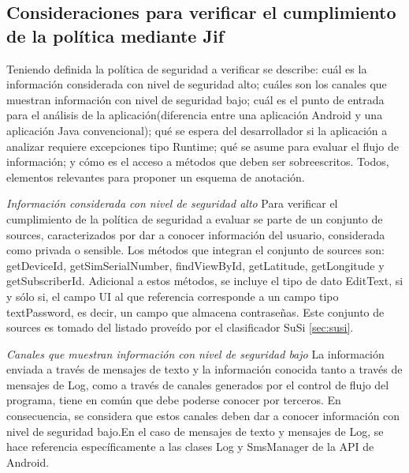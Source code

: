 \subsection{Consideraciones para verificar el cumplimiento de la política
mediante Jif} 
\label{subsec:consVerPol}
Teniendo definida la política de seguridad a verificar se describe: cuál es la
información considerada con nivel de seguridad alto; cuáles son los canales que
muestran información con nivel de seguridad bajo; cuál es el punto de entrada
para el análisis de la aplicación(diferencia entre una aplicación Android y una
aplicación Java convencional); qué se espera del desarrollador si la aplicación
a analizar requiere excepciones tipo Runtime; qué se asume para evaluar el flujo
de información; y cómo es el acceso a métodos que deben ser
sobreescritos.\newline
Todos, elementos relevantes para proponer un esquema de anotación.

\textit{Información considerada con nivel de seguridad alto}\newline
Para verificar el cumplimiento de la política de seguridad a evaluar se parte de
un conjunto de sources, caracterizados por dar a conocer
información del usuario, considerada como privada o sensible. Los métodos que integran
el conjunto de sources son: getDeviceId, getSimSerialNumber, findViewById,
getLatitude, getLongitude y getSubscriberId. Adicional a estos métodos, se
incluye el tipo de dato EditText, si y sólo si, el campo UI al que referencia
corresponde a un campo tipo textPassword, es decir, un campo que almacena
contraseñas.\newline 
Este conjunto de sources es tomado del listado proveído por el clasificador SuSi
\ref{sec:susi}.

\textit{Canales que muestran información con nivel de seguridad bajo}\newline
La información enviada a través de mensajes de texto y la información conocida
tanto a través de mensajes de Log, como a través de canales generados por el
control de flujo del programa, tiene en común que debe poderse conocer por
terceros.
En consecuencia, se considera que estos canales deben dar a conocer información
con nivel de seguridad bajo.\newline En el caso de mensajes de texto y mensajes
de Log, se hace referencia específicamente a las clases Log y SmsManager de la
API de Android.

